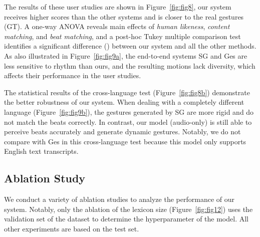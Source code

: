 \documentclass[acmtog,authorversion]{acmart}
\newcommand{\fig}{Figure{}~}
\begin{document}
The results of these user studies are shown in \fig\ref{fig:fig8}, our system receives higher scores than the other systems and is closer to the real gestures (GT). A one-way ANOVA reveals main effects of \emph{human likeness}, \emph{content matching}, and \emph{beat matching}, and a post-hoc Tukey multiple comparison test identifies a significant difference () between our system and all the other methods. 
As also illustrated in \fig\ref{fig:fig9a}, the end-to-end systems SG and Ges are less sensitive to rhythm than ours, and the resulting motions lack diversity, which affects their performance in the user studies.

The statistical results of the cross-language test (\fig\ref{fig:fig8b}) demonstrate the better robustness of our system. When dealing with a completely different language (\fig\ref{fig:fig9b}), the gestures generated by SG are more rigid and do not match the beats correctly. In contrast, our model (audio-only) is still able to perceive beats accurately and generate dynamic gestures. Notably, we do not compare with Ges in this cross-language test because this model only supports English text transcripts. 

\subsection{Ablation Study}
\label{subsec:ablation_study}
We conduct a variety of ablation studies to analyze the performance of our system. Notably, only the ablation of the lexicon size (\fig\ref{fig:fig12}) uses the validation set of the dataset to determine the hyperparameter of the model. All other experiments are based on the test set.
\end{document}
